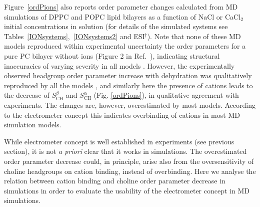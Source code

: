 \documentclass[twoside,twocolumn,9pt]{article}
\begin{document}
Figure~\ref{ordPions} also reports order parameter changes calculated from MD simulations
of DPPC and POPC lipid bilayers as a function of NaCl or CaCl$_2$ initial concentrations in solution
(for details of the simulated systems see Tables~\ref{IONsystems},~\ref{IONsystems2} and ESI$^\dag$).
Note that none of these MD models
reproduced within experimental uncertainty the order parameters for a pure PC bilayer without ions
(Figure 2 in Ref.~),
indicating structural inaccuracies of varying severity in all models \cite{botan15}.
However, the experimentally observed headgroup order parameter increase with dehydration
was qualitatively reproduced by all the models \cite{botan15}, and 
similarly here the presence of cations leads to the decrease 
of $S_\mathrm{CH}^\beta$ and $S_\mathrm{CH}^\alpha$ (Fig. \ref{ordPions}), in qualitative
agreement with experiments. The changes are, however, overestimated by most models.
According to the electrometer concept this indicates overbinding of cations in most MD simulation
models.

While electrometer concept is well established in experiments (see previous section),
it is not {\it a priori} clear that it works in simulations. The overestimated order parameter
decrease could, in principle, arise also from the oversensitivity of choline headgroups on cation binding,
instead of overbinding. Here we analyse the relation between cation binding and choline order 
parameter decrease in simulations in order to evaluate the usability of the electrometer concept in MD simulations.
\end{document}
